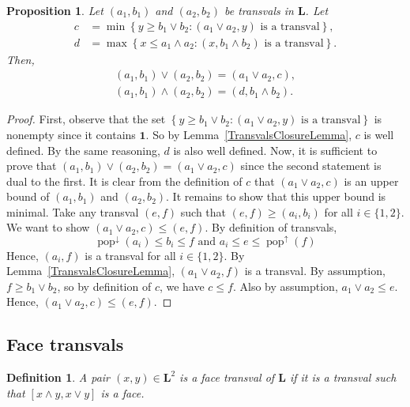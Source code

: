 \documentclass[leqno, 12pt]{amsart}
\numberwithin{equation}{section}
\renewcommand{\L}{\mathbf L}
\newcommand{\popdown}{\operatorname{pop}^\downarrow}
\newcommand{\popup}{\operatorname{pop}^\uparrow}
\newcommand{\Lmax}{\mathbf 1}
\numberwithin{equation}{section}
\newtheorem{prop}[thm]{Proposition}
\newtheorem{defi}[thm]{Definition}
\theoremstyle{remark}
\begin{document}
  \begin{prop}\label{prop:transvals_join_meet}
    Let \((a_1,b_1)\) and \((a_2,b_2)\) be transvals in \(\L\). Let
    \begin{align*}
      c &= \min \left\{ y \geq b_1 \vee b_2 : (a_1 \vee a_2,y) \text{ is a transval} \right\}, \\     
      d &= \max \left\{ x \leq a_1 \wedge a_2 : (x, b_1 \wedge b_2) \text{ is a transval} \right\}.
    \end{align*}
    Then,
    \begin{align*}
      (a_1,b_1) \vee (a_2,b_2) = ( a_1 \vee a_2, c), \\
      (a_1,b_1) \wedge (a_2,b_2) = ( d , b_1 \wedge b_2 ).
    \end{align*}
  \end{prop}
  \begin{proof}
    First, observe that the set $\left\{ y \geq b_1 \vee b_2 : (a_1 \vee a_2,y) \text{ is a transval} \right\}$ is nonempty since it contains \(\Lmax\). So by Lemma~\ref{TransvalsClosureLemma}, \(c\) is well defined. By the same reasoning, \(d\) is also well defined.
    Now, it is sufficient to prove that \((a_1,b_1) \vee (a_2,b_2) = ( a_1 \vee a_2, c)\) since the second statement is dual to the first.
    It is clear from the definition of $c$ that $(a_1 \vee a_2, c)$ is an upper bound of $(a_1,b_1)$ and $(a_2,b_2)$. It remains to show that this upper bound is minimal.
    Take any transval \((e,f)\) such that \((e,f) \geq (a_i,b_i)\) for all \(i \in \{1,2\}\).
    We want to show \((a_1 \vee a_2, c) \leq (e,f)\). By definition of transvals,
    \[\popdown(a_i) \leq b_i \leq f \text{ and } a_i \leq e \leq \popup(f)\]
    Hence, \((a_i,f)\) is a transval for all \(i \in \{1,2\}\).
    By Lemma~\ref{TransvalsClosureLemma}, \((a_1 \vee a_2, f)\) is a transval.
    By assumption, \(f \geq b_1 \vee b_2\), so by definition of \(c\), we have \(c \leq f\).
    Also by assumption, \(a_1 \vee a_2 \leq e\). Hence, \((a_1 \vee a_2, c) \leq (e,f)\).
  \end{proof}
 

\subsection{Face transvals}
\begin{defi}
    A pair $(x,y)\in \L^2$ is a face transval of $\L$ if it is a transval such that $[x\wedge y,x\vee y]$ is a face.
\end{defi}
\end{document}
